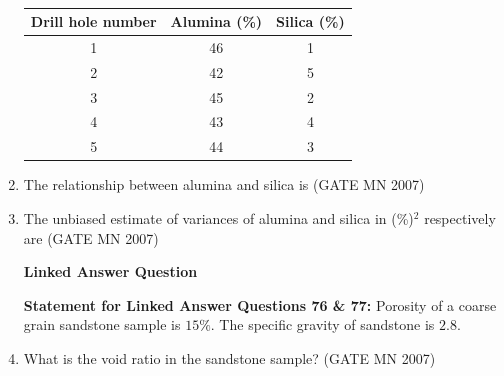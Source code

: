 \documentclass[journal]{IEEEtran}
\begin{document}
\begin{enumerate}
\begin{table}[H]
    \centering\normalsize
\begin{tabular}{|c|c|c|}
\hline
Drill hole number & Alumina (\%) & Silica (\%) \\
\hline
1 & 46 & 1 \\
\hline
2 & 42 & 5 \\
\hline
3 & 45 & 2 \\
\hline
4 & 43 & 4 \\
\hline
5 & 44 & 3 \\
\hline
\end{tabular}
    \caption{}
    \label{tab:Q74&Q75}
\end{table}

    \item The relationship between alumina and silica is  
	    \hfill (GATE MN 2007)
    \begin{enumerate}
    \end{enumerate}

    \item The unbiased estimate of variances of alumina and silica in (\%)$^2$ respectively are  
	    \hfill (GATE MN 2007)
    \begin{enumerate}
    \end{enumerate}


\begin{center}
	\textbf{Linked Answer Question}
\end{center}

\textbf{Statement for Linked Answer Questions 76 \& 77:}  
Porosity of a coarse grain sandstone sample is $15\%$. The specific gravity of sandstone is $2.8$.

\item What is the void ratio in the sandstone sample? 
	\hfill (GATE MN 2007)
    \begin{enumerate}
    \end{enumerate}



\end{enumerate}
\end{document}
